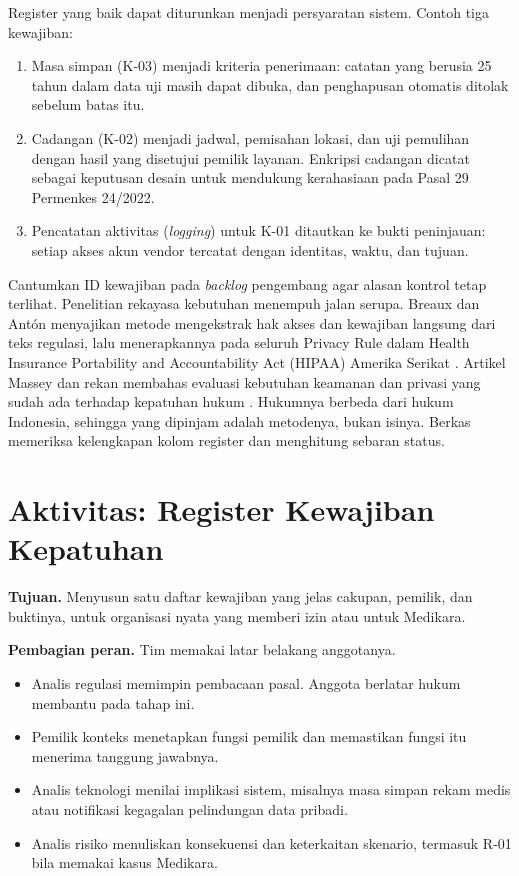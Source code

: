 \begin{pendalaman}
Register yang baik dapat diturunkan menjadi persyaratan sistem. Contoh tiga kewajiban:
\begin{enumerate}
  \item Masa simpan (K-03) menjadi kriteria penerimaan: catatan yang berusia 25 tahun dalam data uji masih dapat
  dibuka, dan penghapusan otomatis ditolak sebelum batas itu.
  \item Cadangan (K-02) menjadi jadwal, pemisahan lokasi, dan uji pemulihan dengan hasil yang disetujui pemilik
  layanan. Enkripsi cadangan dicatat sebagai keputusan desain untuk mendukung kerahasiaan pada Pasal 29 Permenkes
  24/2022.
  \item Pencatatan aktivitas (\textit{logging}) untuk K-01 ditautkan ke bukti peninjauan: setiap akses akun vendor
  tercatat dengan identitas, waktu, dan tujuan.
\end{enumerate}
Cantumkan ID kewajiban pada \textit{backlog} pengembang agar alasan kontrol tetap terlihat. Penelitian rekayasa
kebutuhan menempuh jalan serupa. Breaux dan Antón menyajikan metode mengekstrak hak akses dan kewajiban langsung dari
teks regulasi, lalu menerapkannya pada seluruh Privacy Rule dalam Health Insurance Portability and Accountability Act
(HIPAA) Amerika Serikat \cite{c03-breaux2008}. Artikel Massey dan rekan membahas evaluasi kebutuhan keamanan dan privasi
yang sudah ada terhadap kepatuhan hukum \cite{c03-massey2010}. Hukumnya berbeda dari hukum Indonesia,
sehingga yang dipinjam adalah metodenya, bukan isinya. Berkas  memeriksa
kelengkapan kolom register dan menghitung sebaran status.
\end{pendalaman}

\section{Aktivitas: Register Kewajiban Kepatuhan}

\textbf{Tujuan.} Menyusun satu daftar kewajiban yang jelas cakupan, pemilik, dan buktinya, untuk organisasi nyata yang
memberi izin atau untuk Medikara.

\textbf{Pembagian peran.} Tim memakai latar belakang anggotanya.
\begin{itemize}
  \item Analis regulasi memimpin pembacaan pasal. Anggota berlatar hukum membantu pada tahap ini.
  \item Pemilik konteks menetapkan fungsi pemilik dan memastikan fungsi itu menerima tanggung jawabnya.
  \item Analis teknologi menilai implikasi sistem, misalnya masa simpan rekam medis atau notifikasi kegagalan
  pelindungan data pribadi.
  \item Analis risiko menuliskan konsekuensi dan keterkaitan skenario, termasuk R-01 bila memakai kasus Medikara.
\end{itemize}

